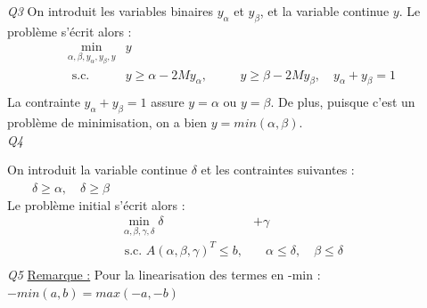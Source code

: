 \documentclass[a4paper,12pt]{article}
\begin{document}
    \textit{Q3 }
    On introduit les variables binaires $y_\alpha$ et $y_\beta$, et la variable continue $y$.
    Le problème s'écrit alors :
    \begin{equation}
        \begin{alignedat}{2}
            \min _{\alpha, \beta, y_\alpha, y_\beta, y} & y \\
            \text{ s.c. } 
            &y \geq \alpha - 2M y_\alpha, & \quad& y \geq \beta - 2M y_\beta, \quad y_\alpha + y_\beta = 1 \\
        \end{alignedat}
    \end{equation}
    La contrainte $y_\alpha + y_\beta = 1$ assure  $y = \alpha$ ou $y = \beta$.
    De plus, puisque c'est un problème de minimisation, on a bien $y = min(\alpha, \beta)$. \\
    \textit{Q4 }

    On introduit la variable continue $\delta$ et les contraintes suivantes :$\qquad \delta \geq \alpha, \quad \delta \geq \beta $ \\
    Le problème initial s'écrit alors :
    \begin{equation}
        \begin{aligned}
            \min _{\alpha, \beta, \gamma, \delta}  \delta &+ \gamma \\
            \text{ s.c. }  A(\alpha, \beta, \gamma)^T \leq b, & \quad \alpha \leq \delta,  \quad \beta \leq \delta \\
        \end{aligned}
    \end{equation}
    \textit{Q5 }
    \underline{Remarque :} Pour la linearisation des termes en -min : $-min(a,b) = max(-a,-b)$ \\
\end{document}
